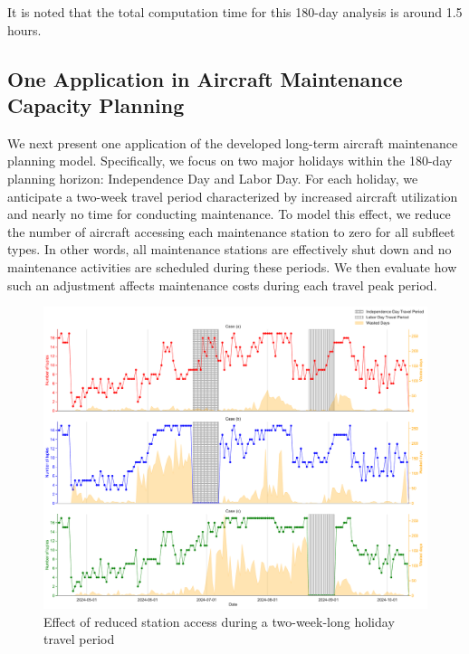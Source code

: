 It is noted that the total computation time for this 180-day analysis is around 1.5 hours.


\subsection{One Application in Aircraft Maintenance Capacity Planning}
\label{sec:twoHolidays}
We next present one application of the developed long-term aircraft maintenance planning model. Specifically, we focus on two major holidays within the 180-day planning horizon: Independence Day and Labor Day. For each holiday, we anticipate a two-week travel period characterized by increased aircraft utilization and nearly no time for conducting maintenance. To model this effect, we reduce the number of aircraft accessing each maintenance station to zero for all subfleet types. In other words, all maintenance stations are effectively shut down and no maintenance activities are scheduled during these periods. We then evaluate how such an adjustment affects maintenance costs during each travel peak period.

\begin{figure}[htbp]
    \centering
    \includegraphics[width=\linewidth]{Effect_hol_red_v1.pdf}
    \caption{Effect of reduced station access during a two-week-long holiday travel period}
    \label{fig:effect_holiday_reduction}
\end{figure}

